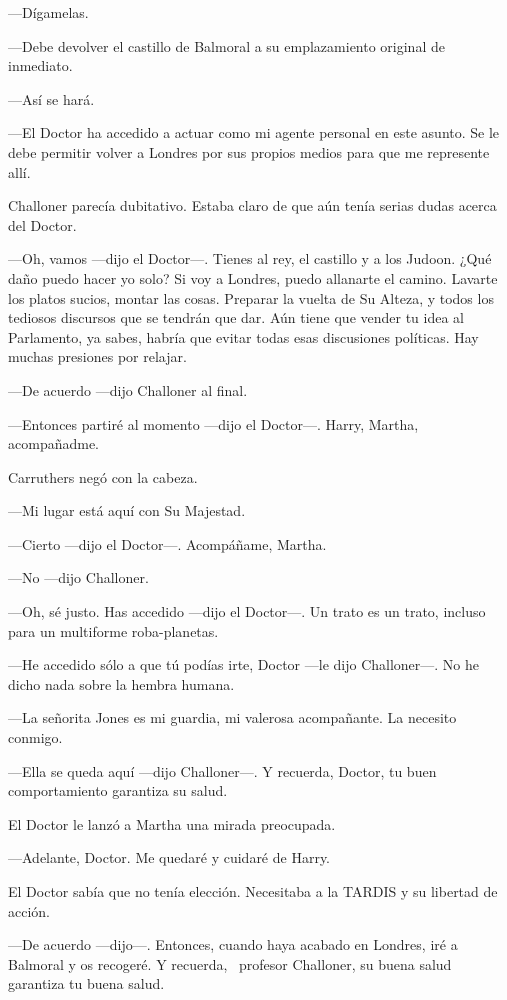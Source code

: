 ---Dígamelas.

---Debe devolver el castillo de Balmoral a su emplazamiento original de
inmediato.

---Así se hará.

---El Doctor ha accedido a actuar como mi agente personal en este
asunto. Se le debe permitir volver a Londres por sus propios medios para
que me represente allí.

Challoner parecía dubitativo. Estaba claro de que aún tenía serias dudas
acerca del Doctor.

---Oh, vamos ---dijo el Doctor---. Tienes al rey, el castillo y a los
Judoon. ¿Qué daño puedo hacer yo solo? Si voy a Londres, puedo
allanarte el camino. Lavarte los platos sucios, montar las cosas.
Preparar la vuelta de Su Alteza, y todos los tediosos discursos que se
tendrán que dar. Aún tiene que vender tu idea al Parlamento, ya sabes,
habría que evitar todas esas discusiones políticas. Hay muchas presiones
por relajar.

---De acuerdo ---dijo Challoner al final.

---Entonces partiré al momento ---dijo el Doctor---. Harry, Martha,
acompañadme.

Carruthers negó con la cabeza.

---Mi lugar está aquí con Su Majestad.

---Cierto ---dijo el Doctor---. Acompáñame, Martha.

---No ---dijo Challoner.

---Oh, sé justo. Has accedido ---dijo el Doctor---. Un trato es un
trato, incluso para un multiforme roba-planetas.

---He accedido sólo a que tú podías irte, Doctor ---le dijo
Challoner---. No he dicho nada sobre la hembra humana.

---La señorita Jones es mi guardia, mi valerosa acompañante. La necesito
conmigo.

---Ella se queda aquí ---dijo Challoner---. Y recuerda, Doctor, tu buen
comportamiento garantiza su salud.

El Doctor le lanzó a Martha una mirada preocupada.

---Adelante, Doctor. Me quedaré y cuidaré de Harry.

El Doctor sabía que no tenía elección. Necesitaba a la TARDIS y su
libertad de acción.

---De acuerdo ---dijo---. Entonces, cuando haya acabado en Londres, iré
a Balmoral y os recogeré. Y recuerda, ~profesor Challoner, su buena
salud garantiza tu buena salud.

